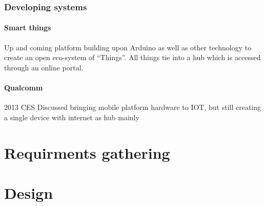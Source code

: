 \documentclass{l4proj}
\begin{document}
\subsection{Developing systems} %
\label{sub:developing_systems}

\subsubsection{Smart things} %
\label{ssub:smart_things}
Up and coming platform building upon Arduino as well as other technology to create an open eco-system of ``Things''. All things tie into a hub which is accessed through an online portal.



\subsubsection{Qualcomm} %
\label{ssub:qualcomm}
2013 CES Discussed bringing mobile platform hardware to IOT, but still creating a single device with internet as hub mainly 






\chapter{Requirments gathering} %
\label{cha:requirments_gathering}






\chapter{Design} %
\label{cha:design}

\end{document}
